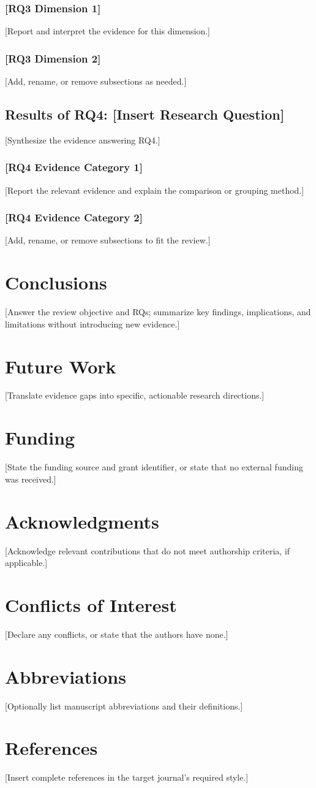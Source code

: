 \documentclass[11pt]{article}
\begin{document}
\subsubsection{[RQ3 Dimension 1]}
[Report and interpret the evidence for this dimension.]

\subsubsection{[RQ3 Dimension 2]}
[Add, rename, or remove subsections as needed.]

\subsection{Results of RQ4: [Insert Research Question]}
[Synthesize the evidence answering RQ4.]

\subsubsection{[RQ4 Evidence Category 1]}
[Report the relevant evidence and explain the comparison or grouping method.]

\subsubsection{[RQ4 Evidence Category 2]}
[Add, rename, or remove subsections to fit the review.]

\section{Conclusions}
[Answer the review objective and RQs; summarize key findings, implications, and limitations without introducing new evidence.]

\section{Future Work}
[Translate evidence gaps into specific, actionable research directions.]

\section*{Funding}
[State the funding source and grant identifier, or state that no external funding was received.]

\section*{Acknowledgments}
[Acknowledge relevant contributions that do not meet authorship criteria, if applicable.]

\section*{Conflicts of Interest}
[Declare any conflicts, or state that the authors have none.]

\section*{Abbreviations}
[Optionally list manuscript abbreviations and their definitions.]

\section*{References}
[Insert complete references in the target journal's required style.]
\end{document}
